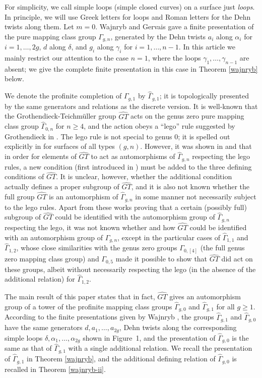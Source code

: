 \documentclass[a4paper,10pt,reqno]{amsart}
\newcommand\GT{\widehat{GT}}
\newcommand\GGone{\widehat{\Gamma}_{g,1}}
\newcommand\GGzero{\widehat{\Gamma}_{g,0}}
\begin{document}
For simplicity, we call simple loops (simple closed curves) on a surface 
just {\it loops}. In principle, we will use Greek letters for loops and Roman letters for the Dehn twists
along them.
Let $m=0$. 
Wajnryb \cite{W} and Gervais \cite{G} gave a finite presentation
of the pure mapping class group $\Gamma_{g,n}$, generated by
the Dehn twists $a_i$ along $\alpha_i$ 
for $i=1,\ldots,2g$, $d$ along $\delta$, 
and $g_i$ along $\gamma_i$
for $i=1,\ldots,n-1$. In this article we mainly restrict
our attention to the case $n=1$, where the loops
$\gamma_1,\ldots,\gamma_{n-1}$ are absent; we give the complete 
finite presentation in this case in Theorem \ref{wajnryb} below.


\vspace{.3cm}
We denote the profinite completion of $\Gamma_{g,1}$ by $\GGone$; it 
is topologically presented by the same generators and relations as the
discrete version. It is well-known that the Grothendieck-Teichm\"uller
group $\GT$ acts on the genus zero pure mapping class group 
$\widehat\Gamma_{0,n}$ for $n\ge 4$, and the action obeys a ``lego'' rule
suggested by Grothendieck in \cite{Gr}. The lego rule is not special to
genus 0; it is spelled out explicitly in \cite{HLS} for surfaces of
all types $(g,n)$. However, it was shown in \cite{HLS} and \cite{NS} that
in order for elements of $\GT$ to act as automorphisms of 
$\widehat\Gamma_{g,n}$ respecting the lego rules, a new condition
(first introduced in \cite{LNS}) must be added to the
three defining conditions of $\GT$. It is unclear,
however, whether the additional condition actually defines a proper subgroup
of $\GT$, and it is also not known whether the full group $\GT$ is an 
automorphism of $\widehat\Gamma_{g,n}$ in some manner not necessarily 
subject to the lego rules. Apart from these works proving that a certain
(possibly full) subgroup of $\GT$ could be identified with the automorphism
group of $\widehat\Gamma_{g,n}$ respecting the lego, it was not known
whether and how $\GT$ could be identified with an automorphism group of
$\widehat\Gamma_{g,n}$, except in the particular cases of 
$\widehat\Gamma_{1,1}$ and $\widehat\Gamma_{1,2}$, whose close similarities
with the genus zero groups $\Gamma_{0,[4]}$ (the full genus zero mapping
class group) and $\Gamma_{0,5}$ made it possible to show that $\GT$
did act on these groups, albeit without necessarily respecting the lego (in the
absence of the additional relation) for $\widehat\Gamma_{1,2}$.

The main result of this paper states that in fact, $\GT$ gives an automorphism
group of a tower of the profinite mapping class groups $\GGzero$ and $\GGone$ for all 
$g\ge 1$.  According to the finite presentations given by
Wajnryb \cite{W}, the groups $\GGone$ and $\GGzero$ have the same generators
$d,a_1,\ldots,a_{2g}$, Dehn twists along the corresponding simple loops
$\delta,\alpha_1,\ldots,\alpha_{2g}$ shown in Figure~1,
and the presentation of $\GGzero$ is the same as that of $\GGone$ with
a single additional relation. We recall the presentation of $\GGone$ in
Theorem \ref{wajnryb}, and the additional defining relation of $\GGzero$ is
recalled in Theorem \ref{wajnryb-ii}.
\end{document}
